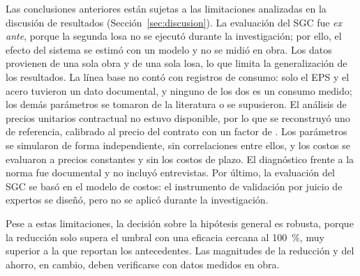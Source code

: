 Las conclusiones anteriores están sujetas a las limitaciones analizadas en la discusión de resultados (Sección~\ref{sec:discusion}). La evaluación del SGC fue \emph{ex ante}, porque la segunda losa no se ejecutó durante la investigación; por ello, el efecto del sistema se estimó con un modelo y no se midió en obra. Los datos provienen de una sola obra y de una sola losa, lo que limita la generalización de los resultados. La línea base no contó con registros de consumo: solo el EPS y el acero tuvieron un dato documental, y ninguno de los dos es un consumo medido; los demás parámetros se tomaron de la literatura o se supusieron. El análisis de precios unitarios contractual no estuvo disponible, por lo que se reconstruyó uno de referencia, calibrado al precio del contrato con un factor de \KappaTrece{}. Los parámetros se simularon de forma independiente, sin correlaciones entre ellos, y los costos se evaluaron a precios constantes y sin los costos de plazo. El diagnóstico frente a la norma fue documental y no incluyó entrevistas. Por último, la evaluación del SGC se basó en el modelo de costos: el instrumento de validación por juicio de expertos se diseñó, pero no se aplicó durante la investigación.

Pese a estas limitaciones, la decisión sobre la hipótesis general es robusta, porque la reducción solo supera el umbral con una eficacia cercana al 100~\%, muy superior a la que reportan los antecedentes. Las magnitudes de la reducción y del ahorro, en cambio, deben verificarse con datos medidos en obra.

\renewcommand{\thesection}{\thechapter.\arabic{section}}
